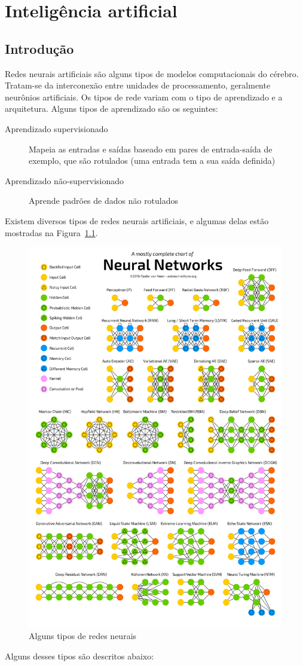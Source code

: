 \chapter{Inteligência artificial}\label{cap:ia}
\section{Introdução}\label{sec:ia_intro}
Redes neurais artificiais são alguns tipos de modelos computacionais do cérebro. Tratam-se da interconexão entre unidades de processamento, geralmente neurônios artificiais. Os tipos de rede variam com o tipo de aprendizado e a arquitetura. Alguns tipos de aprendizado são os seguintes:

\begin{description}
	\item[Aprendizado supervisionado] Mapeia as entradas e saídas baseado em pares de entrada-saída de exemplo, que são rotulados (uma entrada tem a sua saída definida)
	\item[Aprendizado não-supervisionado] Aprende padrões de dados não rotulados
\end{description}

Existem diversos tipos de redes neurais artificiais, e algumas delas estão mostradas na Figura~\ref{fig:neuraltypes}.

\begin{figure}[htb!]
	\centering
	\caption{Alguns tipos de redes neurais}
	\label{fig:neuraltypes}
	\includegraphics[width=0.34\linewidth]{figs/neural_types}
\end{figure}

Alguns desses tipos são descritos abaixo:

